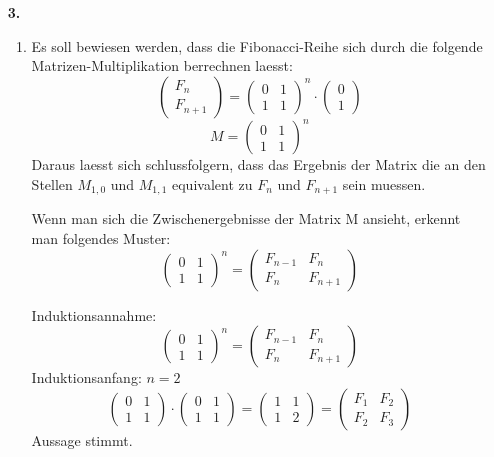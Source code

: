 \documentclass{article}
\begin{document}
\begin{enumerate}
\begin{enumerate}
        \end{enumerate}

    \item[\textbf{3.}]
        \begin{enumerate}
            \item
                Es soll bewiesen werden, dass die Fibonacci-Reihe sich durch die folgende Matrizen-Multiplikation berrechnen laesst:
                    \[ \begin{pmatrix}F_n \\ F_{n+1} \end{pmatrix} 
                    = \begin{pmatrix} 0&1 \\ 1&1 \end{pmatrix}^n
                    \cdot \begin{pmatrix} 0 \\ 1 \end{pmatrix}\]
                \[M = \begin{pmatrix} 0&1 \\ 1&1 \end{pmatrix}^n\]
                Daraus laesst sich schlussfolgern, dass das Ergebnis der Matrix die an den Stellen $M_{1,0}$ und $M_{1,1}$ equivalent zu $F_n$ und $F_{n+1}$ sein muessen. 

                Wenn man sich die Zwischenergebnisse der Matrix M ansieht, erkennt man folgendes Muster:
                    \[\begin{pmatrix} 0&1 \\ 1&1 \end{pmatrix}^n
                    = \begin{pmatrix} F_{n-1} & F_n \\ F_n & F_{n+1} \end{pmatrix} \]

                Induktionsannahme:
                    \[\begin{pmatrix} 0&1 \\ 1&1 \end{pmatrix}^n
                    = \begin{pmatrix} F_{n-1} & F_n \\ F_n & F_{n+1} \end{pmatrix} \]
                Induktionsanfang: $n=2$
                    \[\begin{pmatrix} 0&1 \\ 1&1 \end{pmatrix} \cdot \begin{pmatrix} 0&1 \\ 1&1 \end{pmatrix}
                    = \begin{pmatrix} 1 & 1 \\ 1 & 2 \end{pmatrix}
                    = \begin{pmatrix} F_1 & F_2 \\ F_2 & F_3 \end{pmatrix}\]
                Aussage stimmt.


\end{enumerate}
\end{enumerate}
\end{document}
